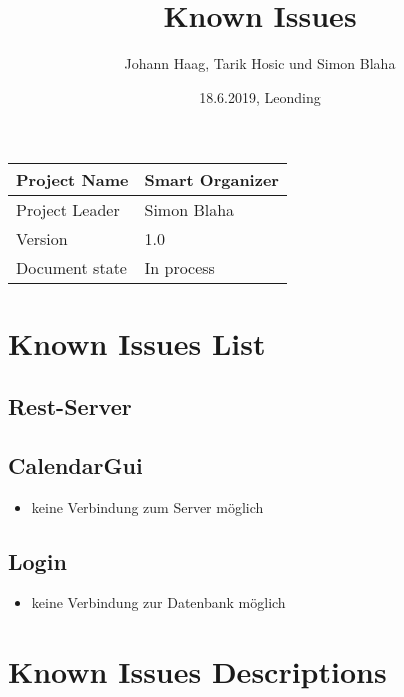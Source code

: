 \documentclass[12pt]{scrartcl}
\title{Known Issues}
\author{Johann Haag, Tarik Hosic und Simon Blaha}
\date{18.6.2019, Leonding}
\begin{document}
    \maketitle
    \begin{flushleft}
    \begin{tabular}{|l|l|}
    \hline
    Project Name & Smart Organizer \\ \hline
    Project Leader & Simon Blaha \\ \hline
    Version & 1.0\\ \hline
    Document state & In process \\ \hline
    \end{tabular}
    \end{flushleft}

    \pagebreak
    \tableofcontents
    \pagebreak

    \section{Known Issues List}
    \subsection{Rest-Server}
    \begin{itemize}
        

    \end{itemize}

    \subsection{CalendarGui}
    \begin{itemize}
        \item keine Verbindung zum Server möglich
    \end{itemize}

    \subsection{Login}
    \begin{itemize}
        \item keine Verbindung zur Datenbank möglich
    \end{itemize}

    \section{Known Issues Descriptions}


\end{document}

